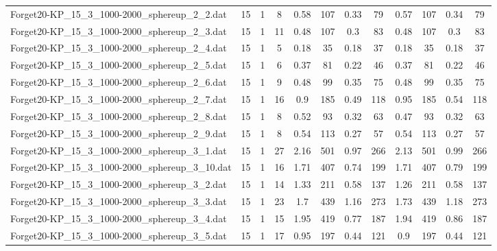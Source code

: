 \begin{sidewaystable}[!ht]
{\begin{tabular}{lccccccccccc}
Forget20-KP\_15\_3\_1000-2000\_sphereup\_2\_2.dat & 15 & 1 & 8 & 0.58 & 107 &  \textcolor{blue2}{0.33} & 79 & 0.57 & 107 & 0.34 & 79 \\
Forget20-KP\_15\_3\_1000-2000\_sphereup\_2\_3.dat & 15 & 1 & 11 & 0.48 & 107 &  \textcolor{blue2}{0.3} & 83 & 0.48 & 107 &  \textcolor{blue2}{0.3} & 83 \\
Forget20-KP\_15\_3\_1000-2000\_sphereup\_2\_4.dat & 15 & 1 & 5 &  \textcolor{blue2}{0.18} & 35 &  \textcolor{blue2}{0.18} & 37 &  \textcolor{blue2}{0.18} & 35 &  \textcolor{blue2}{0.18} & 37 \\
Forget20-KP\_15\_3\_1000-2000\_sphereup\_2\_5.dat & 15 & 1 & 6 & 0.37 & 81 &  \textcolor{blue2}{0.22} & 46 & 0.37 & 81 &  \textcolor{blue2}{0.22} & 46 \\
Forget20-KP\_15\_3\_1000-2000\_sphereup\_2\_6.dat & 15 & 1 & 9 & 0.48 & 99 &  \textcolor{blue2}{0.35} & 75 & 0.48 & 99 &  \textcolor{blue2}{0.35} & 75 \\
Forget20-KP\_15\_3\_1000-2000\_sphereup\_2\_7.dat & 15 & 1 & 16 & 0.9 & 185 & 0.49 & 118 & 0.95 & 185 & 0.54 & 118 \\
Forget20-KP\_15\_3\_1000-2000\_sphereup\_2\_8.dat & 15 & 1 & 8 & 0.52 & 93 &  \textcolor{blue2}{0.32} & 63 & 0.47 & 93 &  \textcolor{blue2}{0.32} & 63 \\
Forget20-KP\_15\_3\_1000-2000\_sphereup\_2\_9.dat & 15 & 1 & 8 & 0.54 & 113 &  \textcolor{blue2}{0.27} & 57 & 0.54 & 113 &  \textcolor{blue2}{0.27} & 57 \\
Forget20-KP\_15\_3\_1000-2000\_sphereup\_3\_1.dat & 15 & 1 & 27 & 2.16 & 501 &  \textcolor{blue2}{0.97} & 266 & 2.13 & 501 & 0.99 & 266 \\
Forget20-KP\_15\_3\_1000-2000\_sphereup\_3\_10.dat & 15 & 1 & 16 & 1.71 & 407 &  \textcolor{blue2}{0.74} & 199 & 1.71 & 407 & 0.79 & 199 \\
Forget20-KP\_15\_3\_1000-2000\_sphereup\_3\_2.dat & 15 & 1 & 14 & 1.33 & 211 &  \textcolor{blue2}{0.58} & 137 & 1.26 & 211 &  \textcolor{blue2}{0.58} & 137 \\
Forget20-KP\_15\_3\_1000-2000\_sphereup\_3\_3.dat & 15 & 1 & 23 & 1.7 & 439 &  \textcolor{blue2}{1.16} & 273 & 1.73 & 439 & 1.18 & 273 \\
Forget20-KP\_15\_3\_1000-2000\_sphereup\_3\_4.dat & 15 & 1 & 15 & 1.95 & 419 &  \textcolor{blue2}{0.77} & 187 & 1.94 & 419 & 0.86 & 187 \\
Forget20-KP\_15\_3\_1000-2000\_sphereup\_3\_5.dat & 15 & 1 & 17 & 0.95 & 197 &  \textcolor{blue2}{0.44} & 121 & 0.9 & 197 &  \textcolor{blue2}{0.44} & 121 \\

\end{tabular}}
\end{sidewaystable}
